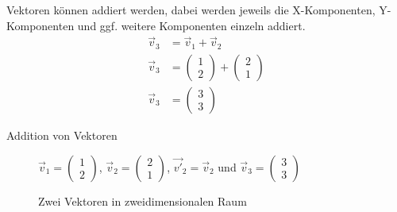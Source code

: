 Vektoren können addiert werden, dabei werden jeweils die X-Komponenten, Y-Komponenten und ggf. weitere Komponenten einzeln addiert.
\begin{align}
  \vec{v}_3 &= \vec{v}_1 + \vec{v}_2\\
  \vec{v}_3 &= \left(\begin{array}{c} 1 \\ 2 \end{array}\right) + \left(\begin{array}{c} 2 \\ 1 \end{array}\right)\\
  \vec{v}_3 &= \left(\begin{array}{c} 3 \\ 3 \end{array}\right)
\end{align}

\begin{frame}{Addition von Vektoren}
  \begin{figure}[htb]

    $\vec{v}_1= \left(\begin{array}{c} 1 \\ 2 \end{array}\right)$, $\vec{v}_2= \left(\begin{array}{c} 2 \\ 1 \end{array}\right)$, $\vec{v'}_2 = \vec{v}_2$  und $\vec{v}_3= \left(\begin{array}{c} 3 \\ 3 \end{array}\right)$
    \caption{Zwei Vektoren in zweidimensionalen Raum}
    \label{fig:ZweiVektorenAddiert}
  \end{figure}
\end{frame}

